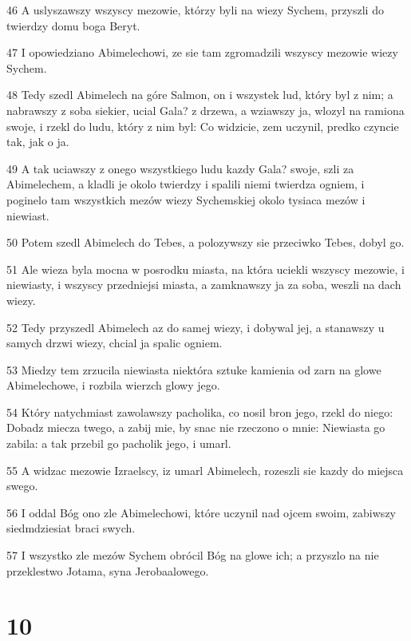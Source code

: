 \par 46 A uslyszawszy wszyscy mezowie, którzy byli na wiezy Sychem, przyszli do twierdzy domu boga Beryt.
\par 47 I opowiedziano Abimelechowi, ze sie tam zgromadzili wszyscy mezowie wiezy Sychem.
\par 48 Tedy szedl Abimelech na góre Salmon, on i wszystek lud, który byl z nim; a nabrawszy z soba siekier, ucial Gala? z drzewa, a wziawszy ja, wlozyl na ramiona swoje, i rzekl do ludu, który z nim byl: Co widzicie, zem uczynil, predko czyncie tak, jak o ja.
\par 49 A tak uciawszy z onego wszystkiego ludu kazdy Gala? swoje, szli za Abimelechem, a kladli je okolo twierdzy i spalili niemi twierdza ogniem, i poginelo tam wszystkich mezów wiezy Sychemskiej okolo tysiaca mezów i niewiast.
\par 50 Potem szedl Abimelech do Tebes, a polozywszy sie przeciwko Tebes, dobyl go.
\par 51 Ale wieza byla mocna w posrodku miasta, na która uciekli wszyscy mezowie, i niewiasty, i wszyscy przedniejsi miasta, a zamknawszy ja za soba, weszli na dach wiezy.
\par 52 Tedy przyszedl Abimelech az do samej wiezy, i dobywal jej, a stanawszy u samych drzwi wiezy, chcial ja spalic ogniem.
\par 53 Miedzy tem zrzucila niewiasta niektóra sztuke kamienia od zarn na glowe Abimelechowe, i rozbila wierzch glowy jego.
\par 54 Który natychmiast zawolawszy pacholika, co nosil bron jego, rzekl do niego: Dobadz miecza twego, a zabij mie, by snac nie rzeczono o mnie: Niewiasta go zabila: a tak przebil go pacholik jego, i umarl.
\par 55 A widzac mezowie Izraelscy, iz umarl Abimelech, rozeszli sie kazdy do miejsca swego.
\par 56 I oddal Bóg ono zle Abimelechowi, które uczynil nad ojcem swoim, zabiwszy siedmdziesiat braci swych.
\par 57 I wszystko zle mezów Sychem obrócil Bóg na glowe ich; a przyszlo na nie przeklestwo Jotama, syna Jerobaalowego.

\chapter{10}


